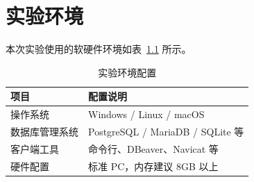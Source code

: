 \chapter{实验环境}

本次实验使用的软硬件环境如表~\cref{tab:environment} 所示。

\begin{table}[htbp]
  \centering
  \caption{实验环境配置}\label{tab:environment}
  \begin{tabular}{ll}
    \toprule
    项目 & 配置说明 \\
    \midrule
    操作系统 & Windows / Linux / macOS \\
    数据库管理系统 & PostgreSQL / MariaDB / SQLite 等 \\
    客户端工具 & 命令行、DBeaver、Navicat 等 \\
    硬件配置 & 标准 PC，内存建议 8GB 以上 \\
    \bottomrule
  \end{tabular}
\end{table}

